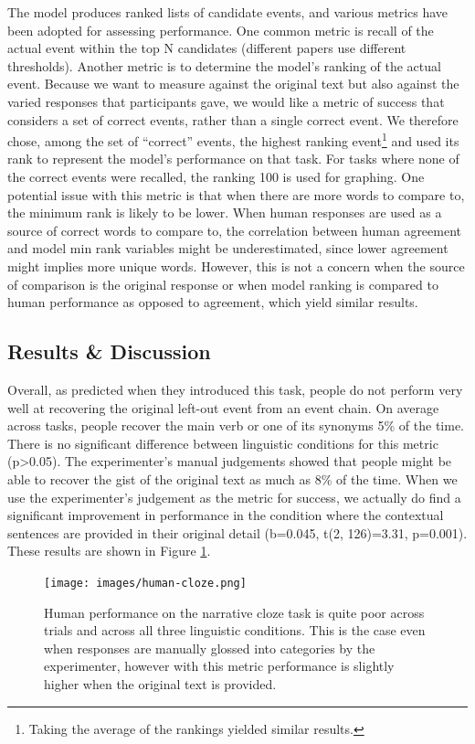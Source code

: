 \documentclass[10pt,a4paper]{article}
\begin{document}
The model produces ranked lists of candidate events, and various metrics have been adopted for assessing performance.
One common metric is recall of the actual event within the top N candidates (different papers use different thresholds). Another metric is to determine the model's ranking of the actual event. Because we want to measure against the original text but also against the varied responses that participants gave, we would like a metric of success that considers a set of correct events, rather than a single correct event. We therefore chose, among the set of ``correct'' events, the highest ranking event\footnote{Taking the average of the rankings yielded similar results.} and used its rank to represent the model's performance on that task. For tasks where none of the correct events were recalled, the ranking 100 is used for graphing.
One potential issue with this metric is that when there are more words to compare to, the minimum rank is likely to be lower. When human responses are used as a source of correct words to compare to, the correlation between human agreement and model min rank variables might be underestimated, since lower agreement might implies more unique words. However, this is not a concern when the source of comparison is the original response or when model ranking is compared to human performance as opposed to agreement, which yield similar results.

\subsection{Results \& Discussion}

Overall, as  predicted when they introduced this task, people do not perform very well at recovering the original left-out event from an event chain. On average across tasks, people recover the main verb or one of its synonyms 5\% of the time. There is no significant difference between linguistic conditions for this metric (p>0.05). The experimenter's manual judgements showed that people might be able to recover the gist of the original text as much as 8\% of the time. When we use the experimenter's judgement as the metric for success, we actually do find a significant improvement in performance in the condition where the contextual sentences are provided in their original detail (b=0.045, t(2, 126)=3.31, p=0.001). These results are shown in Figure \ref{fig:human-cloze}.

\begin{figure}
 \centering
 \texttt{[image: images/human-cloze.png]}
 \caption{Human performance on the narrative cloze task is quite poor across trials and across all three linguistic conditions. This is the case even when responses are manually glossed into categories by the experimenter, however with this metric performance is slightly higher when the original text is provided.}
 \label{fig:human-cloze}
\end{figure}
\end{document}
